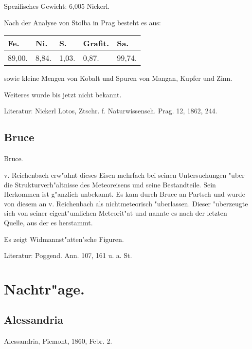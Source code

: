 \documentclass[a4paper, 11pt, oneside]{article}
\begin{document}
Spezifisches Gewicht: 6,005 Nickerl.

Nach der Analyse von Stolba in Prag besteht es aus:
\begin{table}[H]
    \centering
    \begin{tabular}{l l l l l}
        Fe. & Ni. & S. & Grafit. & Sa. \\ \hline
        89,00. & 8,84. & 1,03. & 0,87. & 99,74. \\
    \end{tabular}
\end{table}

sowie kleine Mengen von Kobalt und Spuren von Mangan, Kupfer und Zinn.

Weiteres wurde bis jetzt nicht bekannt.

\footnotesize
Literatur: Nickerl Lotos, Ztschr. f. Naturwissensch. Prag. 12, 1862, 244.

\subsection{Bruce}
\normalsize
\paragraph{}
Bruce.

v. Reichenbach erw"ahnt dieses Eisen mehrfach bei seinen Untersuchungen "uber die Strukturverh"altnisse des Meteoreisens und seine Bestandteile. Sein Herkommen ist g"anzlich unbekannt. Es kam durch Bruce an Partsch und wurde von diesem an v. Reichenbach als nichtmeteorisch "uberlassen. Dieser "uberzeugte sich von seiner eigent"umlichen Meteorit"at und nannte es nach der letzten Quelle, aus der es herstammt.

Es zeigt Widmannst"atten'sche Figuren.

\footnotesize
Literatur: Poggend. Ann. 107, 161 u. a. St.

\section{Nachtr"age.}

\subsection{Alessandria}
\normalsize
\paragraph{}
Alessandria, Piemont, 1860, Febr. 2.
\end{document}
